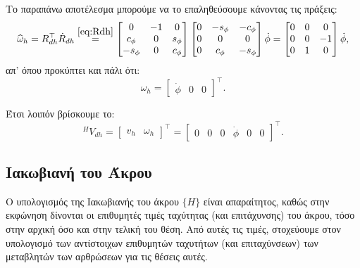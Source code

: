 \documentclass[12pt]{article} %
\numberwithin{equation}{section}  %
\begin{document}
\begin{itemize}
    Το παραπάνω αποτέλεσμα μπορούμε να το επαληθεύσουμε κάνοντας τις πράξεις:
    \begin{equation}
        \widehat{\omega}_h = R_{dh}^{\top} \dot{R}_{dh} \overset{\eqref{eq:Rdh}}{=} 
        \begin{bmatrix}
            0          &  -1  &  0  \\
            c_{\phi}   &  0   &  s_{\phi}  \\
            -s_{\phi}  &  0   &  c_{\phi}
        \end{bmatrix}
        \begin{bmatrix}
            0    &  -s_{\phi}  & -c_{\phi} \\
            0    &  0         &  0    \\
            0    &  c_{\phi}  &  -s_{\phi}
        \end{bmatrix} \dot\phi = 
        \begin{bmatrix}
            0    &  0    &  0 \\
            0    &  0    &  -1    \\
            0    &  1    &  0
        \end{bmatrix} \dot\phi,
    \end{equation}
    απ' όπου προκύπτει και πάλι ότι:
    \begin{equation}\label{eq:omegaH}
        \omega_h = \begin{bmatrix}
            \dot\phi  & 0  &  0
        \end{bmatrix}^{\top}.
    \end{equation}
    
\end{itemize}

Έτσι λοιπόν βρίσκουμε το: 
\begin{equation}\label{eq:Vdh_H}
    ^{H}V_{dh} = \begin{bmatrix} v_h & \omega_h\end{bmatrix}^{\top} = \begin{bmatrix} 0 & 0 & 0 & \dot\phi & 0 & 0 \end{bmatrix}^{\top}.
\end{equation}


\subsection{Ιακωβιανή του Άκρου}
Ο υπολογισμός της Ιακωβιανής του άκρου $\{H\}$ είναι απαραίτητος, καθώς στην εκφώνηση δίνονται οι επιθυμητές τιμές ταχύτητας (και επιτάχυνσης) του άκρου, τόσο στην αρχική όσο και στην τελική του θέση. 
Από αυτές τις τιμές, στοχεύουμε στον υπολογισμό των αντίστοιχων επιθυμητών ταχυτήτων (και επιταχύνσεων) των μεταβλητών των αρθρώσεων για τις θέσεις αυτές.
\end{document}
